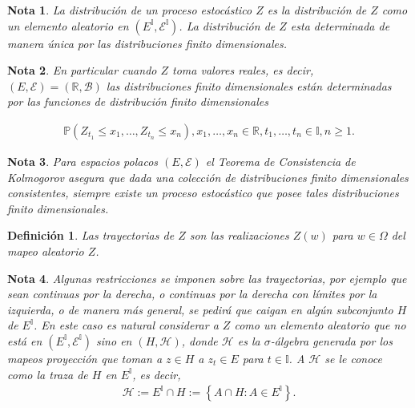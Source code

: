 \documentclass{article}
\newtheorem{Def}{Definición}
\newtheorem{Note}{Nota}
\newcommand{\prob}{\mathbb{P}}
\begin{document}
\begin{Note}
La distribuci\'on de un proceso estoc\'astico $Z$ es la distribuci\'on de $Z$ como un elemento aleatorio en $\left(E^{\mathbb{I}},\mathcal{E}^{\mathbb{I}}\right)$. La distribuci\'on de $Z$ esta determinada de manera \'unica por las distribuciones finito dimensionales.
\end{Note}

\begin{Note}
En particular cuando $Z$ toma valores reales, es decir, $\left(E,\mathcal{E}\right)=\left(\mathbb{R},\mathcal{B}\right)$ las distribuciones finito dimensionales est\'an determinadas por las funciones de distribuci\'on finito dimensionales

\begin{eqnarray}
\prob\left(Z_{t_{1}}\leq x_{1},\ldots,Z_{t_{n}}\leq x_{n}\right),x_{1},\ldots,x_{n}\in\mathbb{R},t_{1},\ldots,t_{n}\in\mathbb{I},n\geq1.
\end{eqnarray}
\end{Note}

\begin{Note}
Para espacios polacos $\left(E,\mathcal{E}\right)$ el Teorema de Consistencia de Kolmogorov asegura que dada una colecci\'on de distribuciones finito dimensionales consistentes, siempre existe un proceso estoc\'astico que posee tales distribuciones finito dimensionales.
\end{Note}


\begin{Def}
Las trayectorias de $Z$ son las realizaciones $Z\left(w\right)$ para $w\in\Omega$ del mapeo aleatorio $Z$.
\end{Def}

\begin{Note}
Algunas restricciones se imponen sobre las trayectorias, por ejemplo que sean continuas por la derecha, o continuas por la derecha con l\'imites por la izquierda, o de manera m\'as general, se pedir\'a que caigan en alg\'un subconjunto $H$ de $E^{\mathbb{I}}$. En este caso es natural considerar a $Z$ como un elemento aleatorio que no est\'a en $\left(E^{\mathbb{I}},\mathcal{E}^{\mathbb{I}}\right)$ sino en $\left(H,\mathcal{H}\right)$, donde $\mathcal{H}$ es la $\sigma$-\'algebra generada por los mapeos proyecci\'on que toman a $z\in H$ a $z_{t}\in E$ para $t\in\mathbb{I}$. A $\mathcal{H}$ se le conoce como la traza de $H$ en $E^{\mathbb{I}}$, es decir,
\begin{eqnarray}
\mathcal{H}:=E^{\mathbb{I}}\cap H:=\left\{A\cap H:A\in E^{\mathbb{I}}\right\}.
\end{eqnarray}
\end{Note}
\end{document}
